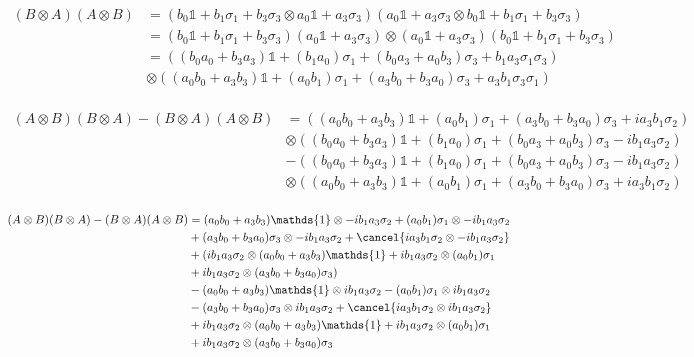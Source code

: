 \[\begin{split}(B\otimes A)(A\otimes B)&=(b_0\mathds{1}+b_1\sigma_1+b_3\sigma_3 \otimes a_0\mathds{1}+a_3\sigma_3) (a_0\mathds{1}+a_3\sigma_3\otimes b_0\mathds{1}+b_1\sigma_1+b_3\sigma_3) \\
    &= (b_0\mathds{1}+b_1\sigma_1+b_3\sigma_3 )(a_0\mathds{1}+a_3\sigma_3)\otimes (a_0\mathds{1}+a_3\sigma_3)( b_0\mathds{1}+b_1\sigma_1+b_3\sigma_3)\\
    &= ((b_0a_0+b_3a_3)\mathds{1}+(b_1a_0)\sigma_1+(b_0a_3+a_0b_3)\sigma_3+b_1a_3\sigma_1\sigma_3)\\
    &\otimes((a_0b_0+a_3b_3)\mathds{1}+(a_0b_1)\sigma_1+(a_3b_0+b_3a_0)\sigma_3+a_3b_1\sigma_3\sigma_1)\\
    \end{split}\]


    \[\begin{split}(A\otimes B)(B\otimes A)-(B\otimes A)(A\otimes B)&=((a_0b_0+a_3b_3)\mathds{1}+(a_0b_1)\sigma_1+(a_3b_0+b_3a_0)\sigma_3+ia_3b_1\sigma_2)\\
        &\otimes ((b_0a_0+b_3a_3)\mathds{1}+(b_1a_0)\sigma_1+(b_0a_3+a_0b_3)\sigma_3-ib_1a_3\sigma_2)\\
         &- ((b_0a_0+b_3a_3)\mathds{1}+(b_1a_0)\sigma_1+(b_0a_3+a_0b_3)\sigma_3-ib_1a_3\sigma_2)\\
        &\otimes((a_0b_0+a_3b_3)\mathds{1}+(a_0b_1)\sigma_1+(a_3b_0+b_3a_0)\sigma_3+ia_3b_1\sigma_2)\\
        \end{split}\]


        \[\begin{split}(A\otimes B)(B\otimes A)-(B\otimes A)(A\otimes B)&=(a_0b_0+a_3b_3)\mathds{1}\otimes- ib_1a_3\sigma_2 +(a_0b_1)\sigma_1\otimes- ib_1a_3\sigma_2\\
        &+(a_3b_0+b_3a_0)\sigma_3\otimes- ib_1a_3\sigma_2+\cancel{ia_3b_1\sigma_2\otimes- ib_1a_3\sigma_2}\\
        &+(ib_1a_3\sigma_2 \otimes (a_0b_0+a_3b_3)\mathds{1}+ib_1a_3\sigma_2 \otimes(a_0b_1)\sigma_1 \\
        &+ib_1a_3\sigma_2 \otimes(a_3b_0+b_3a_0)\sigma_3) \\
        &-(a_0b_0+a_3b_3)\mathds{1}\otimes ib_1a_3\sigma_2 -(a_0b_1)\sigma_1\otimes ib_1a_3\sigma_2\\
        &-(a_3b_0+b_3a_0)\sigma_3\otimes ib_1a_3\sigma_2+\cancel{ia_3b_1\sigma_2\otimes ib_1a_3\sigma_2}\\
        &+ib_1a_3\sigma_2 \otimes (a_0b_0+a_3b_3)\mathds{1}+ib_1a_3\sigma_2 \otimes(a_0b_1)\sigma_1\\
        &+ib_1a_3\sigma_2 \otimes(a_3b_0+b_3a_0)\sigma_3  \\      
            \end{split}\]

